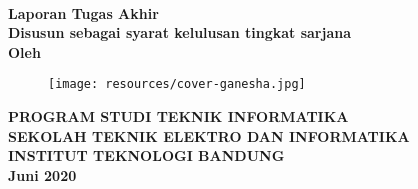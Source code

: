 \clearpage
\pagestyle{empty}


\begin{center}
    
    \smallskip

    \large{\bfseries \MakeUppercase{\thetitle}}
    \\[2\baselineskip]

    \large{\bfseries Laporan Tugas Akhir}
    \\[\baselineskip]

    \normalsize{ \bfseries
    	Disusun sebagai syarat kelulusan tingkat sarjana
	}
    \\[3\baselineskip]

    \normalsize{ \bfseries Oleh\\}
    \large{ \bfseries \MakeUppercase{\theauthor}}

    \vfill
    \begin{figure}[h]
        \centering
      	\texttt{[image: resources/cover-ganesha.jpg]}
    \end{figure}
    \vfill

    \large{ \bfseries
	    \uppercase{
	        Program Studi Teknik Informatika \\
	        Sekolah Teknik Elektro dan Informatika \\
	        Institut Teknologi Bandung\\
	    }
    	Juni 2020
	}

\end{center}
\restoregeometry
\clearpage
